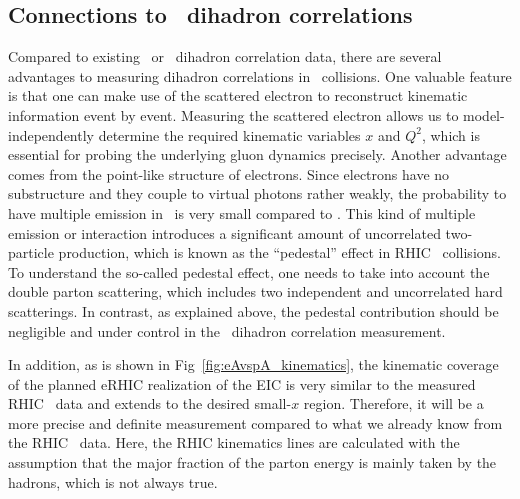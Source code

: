 
\subsection{Connections to \pA\ dihadron correlations}\label{sec:dihadroneAvspA}

Compared to existing \pA\ or \dA\ dihadron correlation data, there are
several advantages to measuring dihadron correlations in \eA\ collisions. 
One valuable feature is that one can make use of the scattered electron to
reconstruct kinematic information event by event. Measuring
the scattered electron allows us to model-independently determine the required
kinematic variables $x$ and $Q^{2}$, which is essential for probing the
underlying gluon dynamics precisely. Another advantage comes from the point-like
structure of electrons. Since electrons have no substructure and they couple to
virtual photons rather weakly, the probability to have multiple emission in \eA\
is very small compared to \pA. This kind of multiple emission or
interaction introduces a significant amount of uncorrelated two-particle production,
which is known as the ``pedestal'' effect in RHIC \dA\ collisions. To understand the
so-called pedestal effect, one needs to take into account the double parton
scattering, which includes two independent and uncorrelated hard scatterings. In
contrast, as explained above, the pedestal contribution should be negligible and
under control in the \eA\ dihadron correlation measurement.

In addition, as is shown in Fig~\ref{fig:eAvspA_kinematics}, the kinematic
coverage of the planned eRHIC realization of the EIC
is very similar to the measured RHIC \dA\ data and
extends to the desired small-$x$ region. Therefore, it will be a more precise and definite
measurement compared to what we already know from the RHIC \dA\ data.
Here, the RHIC kinematics lines are calculated with the assumption that the major fraction of 
the parton energy is mainly taken by the hadrons, which is not always true.


